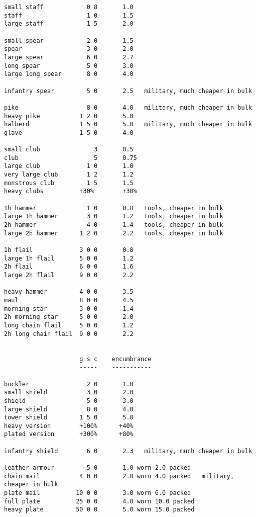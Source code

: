 \begin{verbatim}
small staff            0 8       1.0
staff                  1 0       1.5
large staff            1 5       2.0

small spear            2 0       1.5
spear                  3 0       2.0
large spear            6 0       2.7
long spear             5 0       3.0
large long spear       8 0       4.0

infantry spear         5 0       2.5   military, much cheaper in bulk

pike                   8 0       4.0   military, much cheaper in bulk
heavy pike           1 2 0       5.0
halberd              1 5 0       5.0   military, much cheaper in bulk
glave                1 5 0       4.0

small club               3       0.5
club                     5       0.75
large club             1 0       1.0
very large club        1 2       1.2
monstrous club         1 5       1.5
heavy clubs          +30%        +30%

1h hammer              1 0       0.8   tools, cheaper in bulk
large 1h hammer        3 0       1.2   tools, cheaper in bulk
2h hammer              4 0       1.4   tools, cheaper in bulk
large 2h hammer      1 2 0       2.2   tools, cheaper in bulk

1h flail             3 0 0       0.8
large 1h flail       5 0 0       1.2
2h flail             6 0 0       1.6
large 2h flail       9 0 0       2.2

heavy hammer         4 0 0       3.5
maul                 8 0 0       4.5
morning star         3 0 0       1.4
2h morning star      5 0 0       2.0
long chain flail     5 0 0       1.2
2h long chain flail  9 0 0       2.2


                     g s c    encumbrance
                     -----    -----------

buckler                2 0       1.0
small shield           3 0       2.0
shield                 5 0       3.0
large shield           8 0       4.0
tower shield         1 5 0       5.0
heavy version        +100%      +40%
plated version       +300%      +80%

infantry shield        6 0       2.3   military, much cheaper in bulk

leather armour         5 0       1.0 worn 2.0 packed
chain mail           4 0 0       2.0 worn 4.0 packed   military, cheaper in bulk
plate mail          10 0 0       3.0 worn 6.0 packed
full plate          25 0 0       4.0 worn 10.0 packed
heavy plate         50 0 0       5.0 worn 15.0 packed



\end{verbatim}
